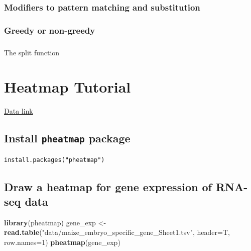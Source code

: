 \documentclass[]{book}
\makeatletter
\newenvironment{Shaded}{\begin{snugshade}}{\end{snugshade}}
\newcommand{\KeywordTok}[1]{\textcolor[rgb]{0.13,0.29,0.53}{\textbf{#1}}}
\newcommand{\DataTypeTok}[1]{\textcolor[rgb]{0.13,0.29,0.53}{#1}}
\newcommand{\DecValTok}[1]{\textcolor[rgb]{0.00,0.00,0.81}{#1}}
\newcommand{\StringTok}[1]{\textcolor[rgb]{0.31,0.60,0.02}{#1}}
\newcommand{\NormalTok}[1]{#1}
\newenvironment{kframe}{%
\medskip{}
\setlength{\fboxsep}{.8em}
 \def\at@end@of@kframe{}%
 \ifinner\ifhmode%
  \def\at@end@of@kframe{\end{minipage}}%
  \begin{minipage}{\columnwidth}%
 \fi\fi%
 \def\FrameCommand##1{\hskip\@totalleftmargin \hskip-\fboxsep
 \colorbox{shadecolor}{##1}\hskip-\fboxsep
     \hskip-\linewidth \hskip-\@totalleftmargin \hskip\columnwidth}%
 \MakeFramed {\advance\hsize-\width
   \@totalleftmargin\z@ \linewidth\hsize
   \@setminipage}}%
 {\par\unskip\endMakeFramed%
 \at@end@of@kframe}
\renewenvironment{Shaded}{\begin{kframe}}{\end{kframe}}
\theoremstyle{definition}
\theoremstyle{definition}
\theoremstyle{definition}
\theoremstyle{remark}
\makeatother
\begin{document}
\subsection{Modifiers to pattern matching and
substitution}\label{modifiers-to-pattern-matching-and-substitution-1}

\subsection{Greedy or non-greedy}\label{greedy-or-non-greedy-1}

\subsection{}\label{section-5}

The split function

\chapter{Heatmap Tutorial}\label{heatmap-tutorial}

\href{https://goo.gl/KLZ7N0}{Data link}

\section{\texorpdfstring{Install \texttt{pheatmap}
package}{Install pheatmap package}}\label{install-pheatmap-package}

\begin{verbatim}
install.packages("pheatmap")
\end{verbatim}

\section{Draw a heatmap for gene expression of RNA-seq
data}\label{draw-a-heatmap-for-gene-expression-of-rna-seq-data}

\begin{Shaded}
\begin{Highlighting}[]
\KeywordTok{library}\NormalTok{(pheatmap)}
\NormalTok{gene_exp <-}\StringTok{ }\KeywordTok{read.table}\NormalTok{(}\StringTok{"data/maize_embryo_specific_gene_Sheet1.tsv"}\NormalTok{, }\DataTypeTok{header=}\NormalTok{T, }\DataTypeTok{row.names=}\DecValTok{1}\NormalTok{)}
\KeywordTok{pheatmap}\NormalTok{(gene_exp)}
\end{Highlighting}
\end{Shaded}
\end{document}
